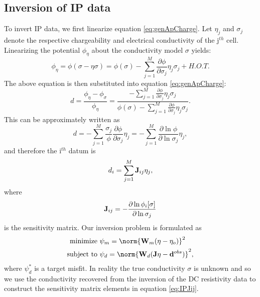 \subsection{Inversion of IP data}
\label{invIPdataSection}
To invert IP data, we first linearize equation \ref{eq:genApCharge}. Let $\eta_j$ and $\sigma_j$ denote the respective chargeability and electrical conductivity of the j$^{th}$ cell. Linearizing the potential $\phi_\eta$ about the conductivity model $\sigma$ yields: 
%
\begin{equation}
\phi_\eta = \phi(\sigma - \eta\sigma)=\phi(\sigma) - \sum\limits_{j=1}^M\frac{\partial\phi}{\partial\sigma_j}\eta_j\sigma_j + H.O.T.
\end{equation}
%
The above equation is then substituted into equation \ref{eq:genApCharge}:
%
\begin{equation}
d = \frac{\phi_\eta-\phi_\sigma}{\phi_\eta} = \frac{-\sum\limits_{j=1}^M\frac{\partial\phi}{\partial\sigma_j}\eta_j\sigma_j}{\phi(\sigma)- \sum\limits_{j=1}^M\frac{\partial\phi}{\partial\sigma_j}\eta_j\sigma_j}.
\end{equation}
%
This can be approximately written as
%
\begin{equation}
d = -\sum\limits_{j=1}^M\frac{\sigma_j}{\phi}\frac{\partial\phi}{\partial\sigma_j}\eta_j = -\sum\limits_{j=1}^M\frac{\partial \ln\phi}{\partial\ln\sigma_j}\eta_j,
\end{equation}
%
and therefore the i$^{th}$ datum is
%
\begin{equation}
d_i = \sum\limits_{j=1}^M\mathbf{J}_{ij}\eta_j,
\label{eq:ithIPdat}
\end{equation}
%
where
\begin{equation}
\mathbf{J}_{ij} = -\frac{\partial\ln\phi_i[\sigma]}{\partial\ln\sigma_j}
\label{eq:IPJij}
\end{equation}
%
is the sensitivity matrix. Our inversion problem is formulated as 
%
\begin{eqnarray}
\mbox{minimize } &\psi_m = \norm{\bvec{W}_m(\eta-\eta_o)}^2 \nonumber \\
\mbox{subject to } &\psi_d=\norm{\bvec{W}_d(\bvec{J}\eta-\bvec{d}^{obs})}^2,
\label{eq:IPphi}
\end{eqnarray}
%
where $\psi_d^*$ is a target misfit. In reality the true conductivity $\sigma$ is unknown and so we use the conductivity recovered from the inversion of the DC resistivity data to construct the sensitivity matrix elements in equation \ref{eq:IPJij}. 


